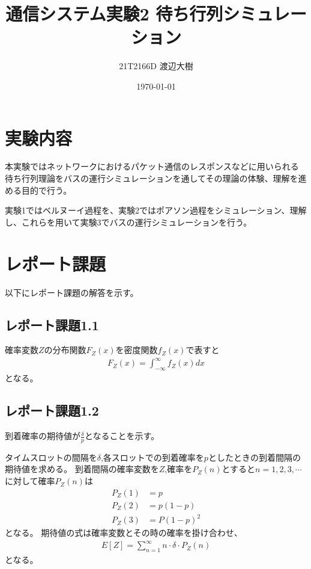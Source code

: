 \documentclass[a4paper,11pt,dvipdfmx]{jsarticle}
\begin{document}

\title{通信システム実験2 待ち行列シミュレーション}
\author{21T2166D 渡辺大樹}
\date{\today}
\maketitle

\section{実験内容}
本実験ではネットワークにおけるパケット通信のレスポンスなどに用いられる
待ち行列理論をバスの運行シミュレーションを通してその理論の体験、理解を進める目的で行う。

実験1ではベルヌーイ過程を、実験2ではポアソン過程をシミュレーション、理解し、これらを用いて実験3でバスの運行シミュレーションを行う。

\section{レポート課題}
以下にレポート課題の解答を示す。

\subsection*{レポート課題1.1}
確率変数$Z$の分布関数$F_Z(x)$を密度関数$f_Z(x)$で表すと
\begin{align}
    F_Z(x) = \int_{-\infty}^{\infty}f_Z(x)dx
\end{align}
となる。

\subsection*{レポート課題1.2}
到着確率の期待値が$\frac{\delta}{p}$となることを示す。

タイムスロットの間隔を$\delta$,各スロットでの到着確率を$p$としたときの到着間隔の期待値を求める。
到着間隔の確率変数を$Z$,確率を$P_Z(n)$とすると$n=1,2,3,\cdots$に対して確率$P_Z(n)$は
\begin{equation}
    \begin{split}
        P_Z(1) &= p \\
        P_Z(2) &= p(1-p) \\
        P_Z(3) &= P(1-p)^2 
    \end{split}
\end{equation}
となる。
期待値の式は確率変数とその時の確率を掛け合わせ、
\begin{align}
    E[Z] = \sum_{n=1}^{\infty}n \cdot \delta \cdot P_Z(n) 
\end{align}
となる。
\end{document}
